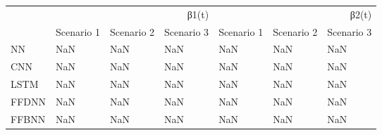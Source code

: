 \begin{tabular}{lllllll}
\toprule
 & \multicolumn{3}{r}{β1(t)} & \multicolumn{3}{r}{β2(t)} \\
 & Scenario 1 & Scenario 2 & Scenario 3 & Scenario 1 & Scenario 2 & Scenario 3 \\
\midrule
NN & NaN & NaN & NaN & NaN & NaN & NaN \\
CNN & NaN & NaN & NaN & NaN & NaN & NaN \\
LSTM & NaN & NaN & NaN & NaN & NaN & NaN \\
FFDNN & NaN & NaN & NaN & NaN & NaN & NaN \\
FFBNN & NaN & NaN & NaN & NaN & NaN & NaN \\
\bottomrule
\end{tabular}
